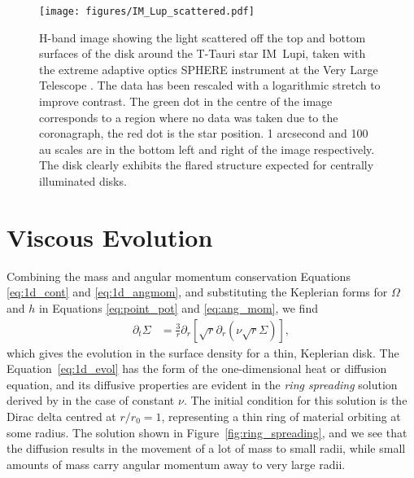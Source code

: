 \begin{figure}
    \centering
    \texttt{[image: figures/IM\_Lup\_scattered.pdf]}
    \caption{H-band image showing the light scattered off the top and bottom surfaces of the disk around the T-Tauri star IM~Lupi, taken with the extreme adaptive optics SPHERE instrument at the Very Large Telescope \citep{avenhaus2018}.
    The data has been rescaled with a logarithmic stretch to improve contrast.
    The green dot in the centre of the image corresponds to a region where no data was taken due to the coronagraph, the red dot is the star position.
    1 arcsecond and 100 au scales are in the bottom left and right of the image respectively.
    The disk clearly exhibits the flared structure expected for centrally illuminated disks.}
    \label{fig:im_lup}
\end{figure}

\section{Viscous Evolution}

Combining the mass and angular momentum conservation Equations \eqref{eq:1d_cont} and \eqref{eq:1d_angmom}, and substituting the Keplerian forms for $\Omega$ and $h$ in Equations \eqref{eq:point_pot} and \eqref{eq:ang_mom}, we find
\begin{align}
    \partial_t \Sigma &= \frac{3}{r} \partial_r \left[ \sqrt{r} \partial_r \left( \nu \sqrt{r} \Sigma  \right)  \right] \label{eq:1d_evol},
\end{align}
which gives the evolution in the surface density for a thin, Keplerian disk.
The Equation~\eqref{eq:1d_evol} has the form of the one-dimensional heat or diffusion equation, and its diffusive properties are evident in the \textit{ring spreading} solution derived by \citet{lynden-bell1974} in the case of constant $\nu$.
The initial condition for this solution is the Dirac delta centred at $r/r_0 = 1$, representing a thin ring of material orbiting at some radius.
The solution shown in Figure~\ref{fig:ring_spreading}, and we see that the diffusion results in the movement of a lot of mass to small radii, while small amounts of mass carry angular momentum away to very large radii.

